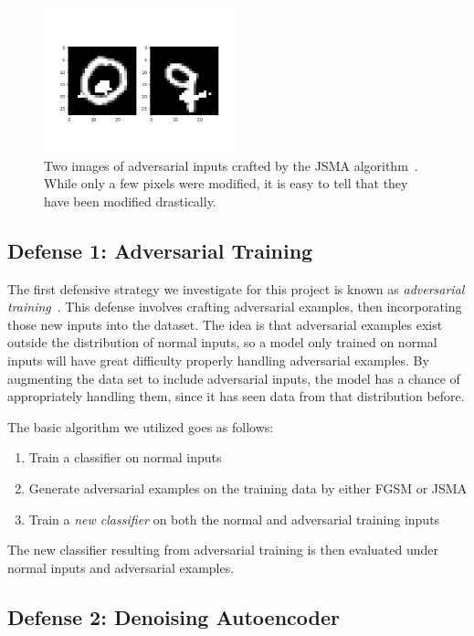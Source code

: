 \documentclass{article}
\begin{document}
\begin{figure}
  \includegraphics[width=0.5\textwidth]{jsma}
  \caption{Two images of adversarial inputs crafted by the JSMA
    algorithm~\cite{papernot2016limitations}. While only a few pixels were
  modified, it is easy to tell that they have been modified drastically.}%
  \label{fig:jsma-ax}
\end{figure}

\subsection{Defense 1: Adversarial Training}

The first defensive strategy we investigate for this project is known as
\textit{adversarial training}~\cite{goodfellow2014explaining}. This defense
involves crafting adversarial examples, then incorporating those new inputs into
the dataset. The idea is that adversarial examples exist outside the
distribution of normal inputs, so a model only trained on normal inputs will
have great difficulty properly handling adversarial examples. By augmenting the
data set to include adversarial inputs, the model has a chance of appropriately
handling them, since it has seen data from that distribution before.

The basic algorithm we utilized goes as follows:
\begin{enumerate}
  \item Train a classifier on normal inputs
  \item Generate adversarial examples on the training data by either FGSM or JSMA
  \item Train a \textit{new classifier} on both the normal and adversarial
    training inputs
\end{enumerate}
The new classifier resulting from adversarial training is then evaluated under
normal inputs and adversarial examples.

\subsection{Defense 2: Denoising Autoencoder}
\end{document}
